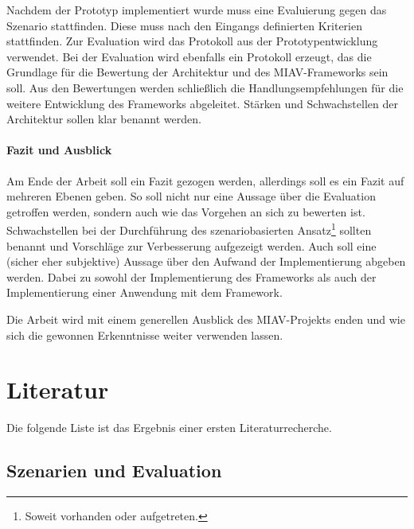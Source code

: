 \documentclass[12pt,headsepline,a4paper,bibtotoc,liststotoc,DIV12,BCOR12mm]{scrartcl}
\begin{document}
  Nachdem der Prototyp implementiert wurde muss eine Evaluierung gegen das Szenario stattfinden. Diese muss nach den Eingangs definierten Kriterien stattfinden. Zur Evaluation wird das Protokoll aus der Prototypentwicklung verwendet. Bei der Evaluation wird ebenfalls ein Protokoll erzeugt, das die Grundlage für die Bewertung der Architektur und des MIAV-Frameworks sein soll. Aus den Bewertungen werden schließlich die Handlungsempfehlungen für die weitere Entwicklung des Frameworks abgeleitet. Stärken und Schwachstellen der Architektur sollen klar benannt werden.


\paragraph{Fazit und Ausblick} %
\label{par:fazit_und_ausblick}

  Am Ende der Arbeit soll ein Fazit gezogen werden, allerdings soll es ein Fazit auf mehreren Ebenen geben. So soll nicht nur eine Aussage über die Evaluation getroffen werden, sondern auch wie das Vorgehen an sich zu bewerten ist. Schwachstellen bei der Durchführung des szenariobasierten Ansatz\footnote{Soweit vorhanden oder aufgetreten.} sollten benannt und Vorschläge zur Verbesserung aufgezeigt werden. Auch soll eine (sicher eher subjektive) Aussage über den Aufwand der Implementierung abgeben werden. Dabei zu sowohl der Implementierung des Frameworks als auch der Implementierung einer Anwendung mit dem Framework.
  
  Die Arbeit wird mit einem generellen Ausblick des MIAV-Projekts enden und wie sich die gewonnen Erkenntnisse weiter verwenden lassen.



\section{Literatur} %
\label{sec:literatur}

  Die folgende Liste ist das Ergebnis einer ersten Literaturrecherche.
  
\subsection{Szenarien und Evaluation} %
\label{sub:szenarien_und_evaluation}
\end{document}
